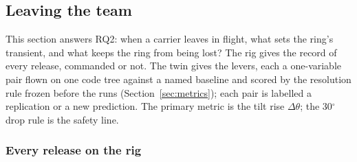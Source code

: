 
\subsection{Leaving the team}
\label{sec:res_leave}

This section answers RQ2: when a carrier leaves in flight, what sets the ring's transient, and what keeps the ring
from being lost? The rig gives the record of every release, commanded or not. The twin gives the levers, each a
one-variable pair flown on one code tree against a named baseline and scored by the resolution rule frozen before
the runs (Section~\ref{sec:metrics}); each pair is labelled a replication or a new prediction. The primary metric is
the tilt rise $\Delta\theta$; the 30$^\circ$ drop rule is the safety line.

\subsubsection{Every release on the rig}
\label{sec:res_detach_rig}


